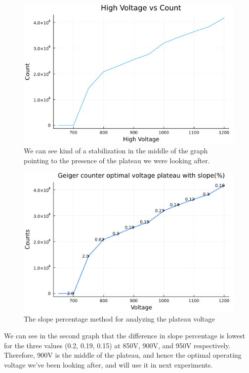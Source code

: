 \documentclass[twocolumn]{article}
\begin{document}
\begin{center}
\begin{figure}[h!]
\includegraphics[scale=0.45]{lab1c.png}
\caption{We can see kind of a stabilization in the middle of the graph pointing to the presence of the plateau we were looking after.}
\end{figure}
\begin{figure}[h!]
\includegraphics[scale=0.033]{lab10.png}
\caption{The slope percentage method for analyzing the plateau voltage}
\end{figure}
\end{center}
We can see in the second graph that the difference in slope percentage is lowest for the three values (0.2, 0.19, 0.15) at 850V, 900V, and 950V respectively. Therefore, 900V is the middle of the plateau, and hence the optimal operating voltage we've been looking after, and will use it in next experiments.\\
\end{document}
